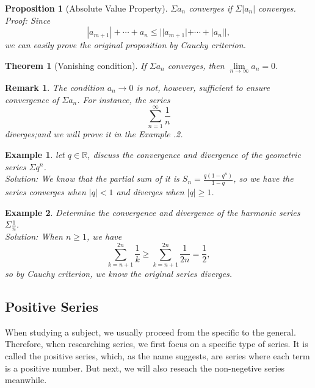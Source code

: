 \documentclass[12pt]{article}
\theoremstyle{oneline}
\newtheorem{theorem}{Theorem}[subsection]
\newtheorem{remark}{Remark}[subsection]
\newtheorem{proposition}{Proposition}[subsection]
\newtheorem{example}{Example}[subsection]
\theoremstyle{twoline}
\begin{document}
\begin{proposition}[Absolute Value Property]
  $\Sigma a_n$ converges if $\Sigma |a_n|$ converges.\\
  \textit{Proof:} Since
  \[|a_{m+1}|+\cdots+a_n\leq||a_{m+1}|+\cdots+|a_n||,\]
  we can easily prove the original proposition by Cauchy criterion.
\end{proposition}

\begin{theorem}[Vanishing condition]
  If $\Sigma a_n$ converges, then $\lim\limits_{n\to\infty}a_n=0$.
\end{theorem}

\begin{remark}
  The condition $a_n\to0$ is not, however, sufficient to ensure convergence of $\Sigma a_n$. For instance, the series 
  \[\sum\limits_{n=1}^\infty \frac1n\]
  diverges;and we will prove it in the \textit{Example \thesubsection.2}.
\end{remark}

\begin{example}
  let $q\in\mathbb{R}$, discuss the convergence and divergence of the geometric series $\Sigma q^n$.\\
\textit{Solution:} We know that the partial sum of it is $S_n=\frac{q(1-q^n)}{1-q}$, so we have the series converges when $|q|<1$ and diverges when $|q|\geq1$.
\end{example}

\begin{example}
  Determine the convergence and divergence of the harmonic series $\Sigma \frac1n$.\\
  \textit{Solution:} When $n\geq 1$, we have
  \[\sum\limits_{k=n+1}^{2n}\frac1k\geq\sum\limits_{k=n+1}^{2n}\frac1{2n}=\frac12,\]
  so by Cauchy criterion, we know the original series diverges.
\end{example}

\subsection{Positive Series}
\introduction
\hspace*{2em}
When studying a subject, we usually proceed from the specific to the general. Therefore, when researching series, we first focus on a specific type of series. It is called the positive series, which, as the name suggests, are series where each term is a positive number. But next, we will also reseach the non-negetive series meanwhile.
\end{document}

